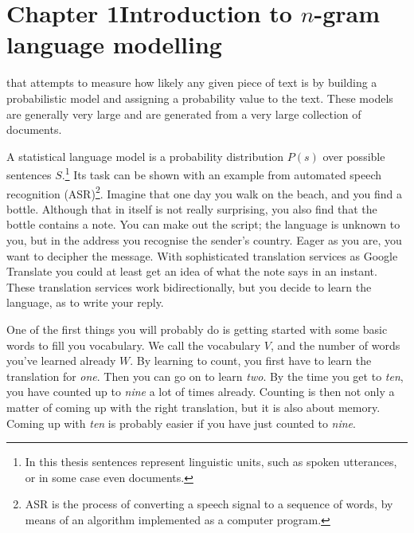 \chapter{Chapter 1\newline Introduction to $n$-gram language modelling}\label{chap:introlm}

 that attempts to measure how likely any given piece of text is by building a probabilistic model and assigning a probability value to the text. These models are generally very large and are generated from a very large collection of documents.

A statistical language model is a probability distribution $P(s)$ over possible sentences $S$.\footnote{In this thesis sentences represent linguistic units, such as spoken utterances, or in some case even documents.} Its task can be shown with an example from automated speech recognition (ASR)\footnote{ASR is the process of converting a speech signal to a sequence of words, by means of an algorithm implemented as a computer program.}. Imagine that one day you walk on the beach, and you find a bottle. Although that in itself is not really surprising, you also find that the bottle contains a note. You can make out the script; the language is unknown to you, but in the address you recognise the sender's country. Eager as you are, you want to decipher the message. With sophisticated translation services as Google Translate you could at least get an idea of what the note says in an instant. These translation services work bidirectionally, but you decide to learn the language, as to write your reply.

One of the first things you will probably do is getting started with some basic words to fill you vocabulary. We call the vocabulary $V$, and the number of words you've learned already $W$. By learning to count, you first have to learn the translation for \emph{one}. Then you can go on to learn \emph{two}. By the time you get to \emph{ten}, you have counted up to \emph{nine} a lot of times already. Counting is then not only a matter of coming up with the right translation, but it is also about memory. Coming up with \emph{ten} is probably easier if you have just counted to \emph{nine}.

